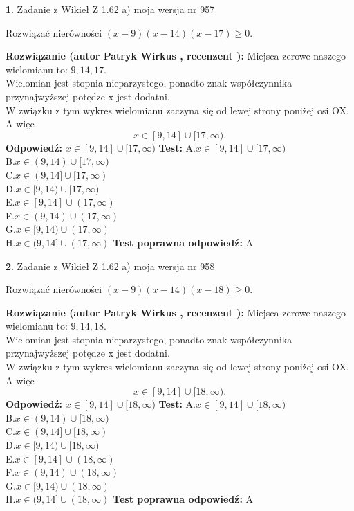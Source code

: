 \documentclass[12pt, a4paper]{article}
\theoremstyle{definition} %
\newtheorem{zad}{}
\newcommand{\zadStart}[1]{\begin{zad}#1\newline}
\newcommand{\zadStop}{\end{zad}}
\newcommand{\rozwStart}[2]{\noindent \textbf{Rozwiązanie (autor #1 , recenzent #2): }\newline}
\newcommand{\rozwStop}{\newline}
\newcommand{\odpStart}{\noindent \textbf{Odpowiedź:}\newline}
\newcommand{\odpStop}{\newline}
\newcommand{\testStart}{\noindent \textbf{Test:}\newline}
\newcommand{\testStop}{\newline}
\newcommand{\kluczStart}{\noindent \textbf{Test poprawna odpowiedź:}\newline}
\newcommand{\kluczStop}{\newline}
\begin{document}
\zadStart{Zadanie z Wikieł Z 1.62 a) moja wersja nr 957}

Rozwiązać nierówności $(x-9)(x-14)(x-17)\ge0$.
\zadStop
\rozwStart{Patryk Wirkus}{}
Miejsca zerowe naszego wielomianu to: $9, 14, 17$.\\
Wielomian jest stopnia nieparzystego, ponadto znak współczynnika przy\linebreak najwyższej potędze x jest dodatni.\\ W związku z tym wykres wielomianu zaczyna się od lewej strony poniżej osi OX. A więc $$x \in [9,14] \cup [17,\infty).$$
\rozwStop
\odpStart
$x \in [9,14] \cup [17,\infty)$
\odpStop
\testStart
A.$x \in [9,14] \cup [17,\infty)$\\
B.$x \in (9,14) \cup [17,\infty)$\\
C.$x \in (9,14] \cup [17,\infty)$\\
D.$x \in [9,14) \cup [17,\infty)$\\
E.$x \in [9,14] \cup (17,\infty)$\\
F.$x \in (9,14) \cup (17,\infty)$\\
G.$x \in [9,14) \cup (17,\infty)$\\
H.$x \in (9,14] \cup (17,\infty)$
\testStop
\kluczStart
A
\kluczStop



\zadStart{Zadanie z Wikieł Z 1.62 a) moja wersja nr 958}

Rozwiązać nierówności $(x-9)(x-14)(x-18)\ge0$.
\zadStop
\rozwStart{Patryk Wirkus}{}
Miejsca zerowe naszego wielomianu to: $9, 14, 18$.\\
Wielomian jest stopnia nieparzystego, ponadto znak współczynnika przy\linebreak najwyższej potędze x jest dodatni.\\ W związku z tym wykres wielomianu zaczyna się od lewej strony poniżej osi OX. A więc $$x \in [9,14] \cup [18,\infty).$$
\rozwStop
\odpStart
$x \in [9,14] \cup [18,\infty)$
\odpStop
\testStart
A.$x \in [9,14] \cup [18,\infty)$\\
B.$x \in (9,14) \cup [18,\infty)$\\
C.$x \in (9,14] \cup [18,\infty)$\\
D.$x \in [9,14) \cup [18,\infty)$\\
E.$x \in [9,14] \cup (18,\infty)$\\
F.$x \in (9,14) \cup (18,\infty)$\\
G.$x \in [9,14) \cup (18,\infty)$\\
H.$x \in (9,14] \cup (18,\infty)$
\testStop
\kluczStart
A
\kluczStop
\end{document}
